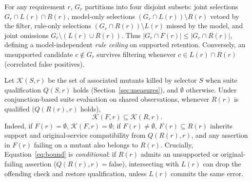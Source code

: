 \documentclass[sigconf,nonacm]{acmart}
\begin{document}
For any requirement $r$, $G_r$ partitions into four disjoint subsets: joint selections $G_r\cap L(r)\cap R(r)$, model-only selections $(G_r\cap L(r))\setminus R(r)$ vetoed by the filter, rule-only selections $(G_r\cap R(r))\setminus L(r)$ missed by the model, and joint omissions $G_r\setminus(L(r)\cup R(r))$. Thus $|G_r\cap F(r)|\leq |G_r\cap R(r)|$, defining a model-independent \emph{rule ceiling} on supported retention. Conversely, an unsupported candidate $c\notin G_r$ survives filtering whenever $c\in L(r)\cap R(r)$ (correlated false positives).

Let $\mathcal{K}(S,r)$ be the set of associated mutants killed by selector $S$ when suite qualification $Q(S,r)$ holds (Section~\ref{sec:measures}), and $\emptyset$ otherwise. Under conjunction-based suite evaluation on shared observations, whenever $R(r)$ is qualified ($Q(R(r),r)$ holds),
\begin{equation}
\mathcal{K}(F,r)\subseteq \mathcal{K}(R,r).
\label{eq:bound}
\end{equation}
Indeed, if $F(r)=\emptyset$, $\mathcal{K}(F,r)=\emptyset$; if $F(r)\neq\emptyset$, $F(r)\subseteq R(r)$ inherits support and original-service compatibility from $Q(R(r),r)$, and any assertion in $F(r)$ failing on a mutant also belongs to $R(r)$. Crucially, Equation~\ref{eq:bound} is \emph{conditional}: if $R(r)$ admits an unsupported or original-failing assertion ($Q(R(r),r)=\text{false}$), intersecting with $L(r)$ can drop the offending check and restore qualification, unless $L(r)$ commits the same error.
\end{document}
